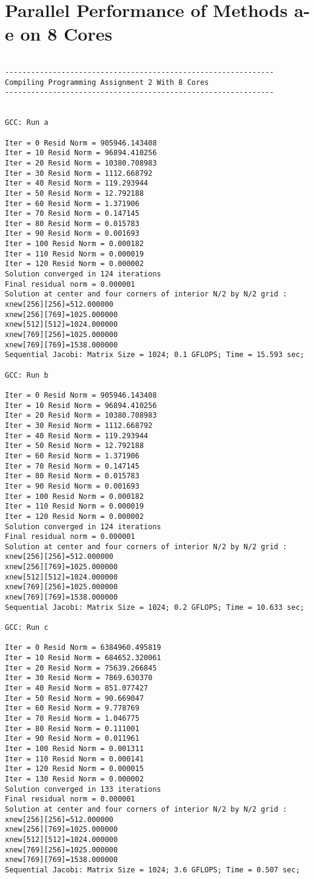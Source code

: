 \documentclass[11pt]{article}
\begin{document}
\section{Parallel Performance of Methods a-e on 8 Cores}
\begin{lstlisting}
 
--------------------------------------------------------------
Compiling Programming Assignment 2 With 8 Cores
--------------------------------------------------------------
 
 
GCC: Run a
 
Iter = 0 Resid Norm = 905946.143408
Iter = 10 Resid Norm = 96894.410256
Iter = 20 Resid Norm = 10380.708983
Iter = 30 Resid Norm = 1112.668792
Iter = 40 Resid Norm = 119.293944
Iter = 50 Resid Norm = 12.792188
Iter = 60 Resid Norm = 1.371906
Iter = 70 Resid Norm = 0.147145
Iter = 80 Resid Norm = 0.015783
Iter = 90 Resid Norm = 0.001693
Iter = 100 Resid Norm = 0.000182
Iter = 110 Resid Norm = 0.000019
Iter = 120 Resid Norm = 0.000002
Solution converged in 124 iterations
Final residual norm = 0.000001
Solution at center and four corners of interior N/2 by N/2 grid : 
xnew[256][256]=512.000000
xnew[256][769]=1025.000000
xnew[512][512]=1024.000000
xnew[769][256]=1025.000000
xnew[769][769]=1538.000000
Sequential Jacobi: Matrix Size = 1024; 0.1 GFLOPS; Time = 15.593 sec; 
 
GCC: Run b
 
Iter = 0 Resid Norm = 905946.143408
Iter = 10 Resid Norm = 96894.410256
Iter = 20 Resid Norm = 10380.708983
Iter = 30 Resid Norm = 1112.668792
Iter = 40 Resid Norm = 119.293944
Iter = 50 Resid Norm = 12.792188
Iter = 60 Resid Norm = 1.371906
Iter = 70 Resid Norm = 0.147145
Iter = 80 Resid Norm = 0.015783
Iter = 90 Resid Norm = 0.001693
Iter = 100 Resid Norm = 0.000182
Iter = 110 Resid Norm = 0.000019
Iter = 120 Resid Norm = 0.000002
Solution converged in 124 iterations
Final residual norm = 0.000001
Solution at center and four corners of interior N/2 by N/2 grid : 
xnew[256][256]=512.000000
xnew[256][769]=1025.000000
xnew[512][512]=1024.000000
xnew[769][256]=1025.000000
xnew[769][769]=1538.000000
Sequential Jacobi: Matrix Size = 1024; 0.2 GFLOPS; Time = 10.633 sec; 
 
GCC: Run c
 
Iter = 0 Resid Norm = 6384960.495819
Iter = 10 Resid Norm = 684652.320061
Iter = 20 Resid Norm = 75639.266845
Iter = 30 Resid Norm = 7869.630370
Iter = 40 Resid Norm = 851.077427
Iter = 50 Resid Norm = 90.669047
Iter = 60 Resid Norm = 9.778769
Iter = 70 Resid Norm = 1.046775
Iter = 80 Resid Norm = 0.111001
Iter = 90 Resid Norm = 0.011961
Iter = 100 Resid Norm = 0.001311
Iter = 110 Resid Norm = 0.000141
Iter = 120 Resid Norm = 0.000015
Iter = 130 Resid Norm = 0.000002
Solution converged in 133 iterations
Final residual norm = 0.000001
Solution at center and four corners of interior N/2 by N/2 grid : 
xnew[256][256]=512.000000
xnew[256][769]=1025.000000
xnew[512][512]=1024.000000
xnew[769][256]=1025.000000
xnew[769][769]=1538.000000
Sequential Jacobi: Matrix Size = 1024; 3.6 GFLOPS; Time = 0.507 sec; 
 

\end{lstlisting}
\end{document}
